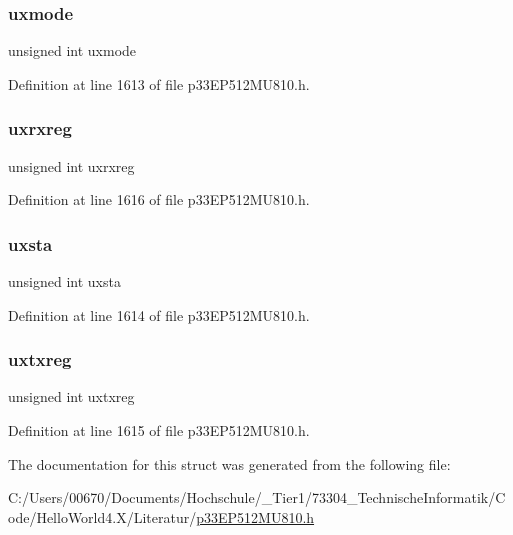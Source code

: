 \mbox{\label{structtag_u_a_r_t_a298db6553023d427aad6ff60f3c3b00b}} 
\subsubsection{\texorpdfstring{uxmode}{uxmode}}
{\footnotesize\ttfamily unsigned int uxmode}



Definition at line 1613 of file p33\+E\+P512\+M\+U810.\+h.

\mbox{\label{structtag_u_a_r_t_af700a4d88899358a5ae718079b5ee3b9}} 
\subsubsection{\texorpdfstring{uxrxreg}{uxrxreg}}
{\footnotesize\ttfamily unsigned int uxrxreg}



Definition at line 1616 of file p33\+E\+P512\+M\+U810.\+h.

\mbox{\label{structtag_u_a_r_t_a05f40b1f94adb34e7c268d0e2e21c951}} 
\subsubsection{\texorpdfstring{uxsta}{uxsta}}
{\footnotesize\ttfamily unsigned int uxsta}



Definition at line 1614 of file p33\+E\+P512\+M\+U810.\+h.

\mbox{\label{structtag_u_a_r_t_a0fbe38b0673ceec8294031c94f65cf3c}} 
\subsubsection{\texorpdfstring{uxtxreg}{uxtxreg}}
{\footnotesize\ttfamily unsigned int uxtxreg}



Definition at line 1615 of file p33\+E\+P512\+M\+U810.\+h.



The documentation for this struct was generated from the following file\+:\begin{DoxyCompactItemize}
\item 
C\+:/\+Users/00670/\+Documents/\+Hochschule/\+\_\+\+Tier1/73304\+\_\+\+Technische\+Informatik/\+Code/\+Hello\+World4.\+X/\+Literatur/\hyperlink{p33_e_p512_m_u810_8h}{p33\+E\+P512\+M\+U810.\+h}\end{DoxyCompactItemize}
